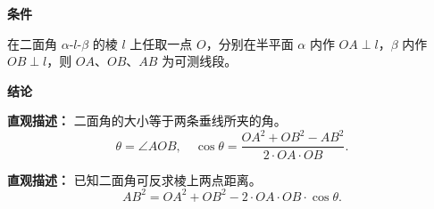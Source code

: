 \begin{statementbox}
	\textbf{\textcolor{CStatement}{条件}}
	\begin{description}[style=nextline, leftmargin=2.8em, labelsep=0.5em, itemsep=0.35em]
		\item[\textbf{\textcolor{CStatement}{条件 1（棱上垂线）：}}] 在二面角 $\alpha\text{-}l\text{-}\beta$ 的棱 $l$ 上任取一点 $O$，分别在半平面 $\alpha$ 内作 $OA\perp l$，$\beta$ 内作 $OB\perp l$，则 $OA$、$OB$、$AB$ 为可测线段。
	\end{description}

	\textbf{\textcolor{CStatement}{结论}}
	\begin{description}[style=nextline, leftmargin=2.8em, labelsep=0.5em, itemsep=0.45em]
		\item[\textbf{\textcolor{CStatement}{结论一（定义求角）：}}]
			\textbf{\textcolor{CStatement}{直观描述：}}
			二面角的大小等于两条垂线所夹的角。
			\[
				\theta = \angle AOB,\quad \cos\theta = \frac{OA^2 + OB^2 - AB^2}{2\cdot OA \cdot OB}.
			\]

		\item[\textbf{\textcolor{CStatement}{常见变形（余弦反求）：}}]
			\textbf{\textcolor{CStatement}{直观描述：}}
			已知二面角可反求棱上两点距离。
			\[
				AB^2 = OA^2 + OB^2 - 2\cdot OA\cdot OB\cdot \cos\theta .
			\]
	\end{description}
\end{statementbox}
